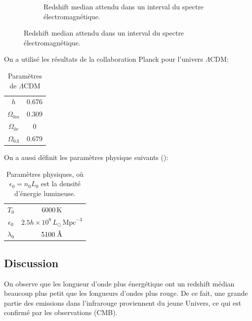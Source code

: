 \documentclass{article}
\newcommand{\angstrom}{\textup{\AA}}
\numberwithin{equation}{section}
\newcommand{\s}{\hspace{0.1cm}}
\begin{document}
\begin{figure}[H]
\begin{subfigure}[t]{0.45\textwidth}
                \caption{Redshift median attendu dans un interval du spectre 
                électromagnétique.}
                \label{fig:z_median}
        \end{subfigure}
\end{figure}

On a utilisé les résultats de la collaboration Planck pour l'univers $\Lambda$CDM:
\begin{table}[H]
        \centering
        \begin{tabular}{cc}
                \toprule
                $h$ & 0.676 \\
                $\Omega_{0m}$ & 0.309\\
                $\Omega_{0r}$ & 0 \\
                $\Omega_{0\Lambda}$ & 0.679\\
                \bottomrule
                
        \end{tabular}
        \caption{Paramètres de $\Lambda$CDM}
        \label{tab:LCDMparam}
\end{table}
On a aussi définit les paramètres physique suivants (\cite{Wesson1991}):
\begin{table}[H]
        \centering
        \begin{tabular}{cc}
                \toprule 
                $T_0$ & $6000\, \text{K}$ \\
                $\epsilon_0 $ & $2.5 h\times 10^{8}\, L_{\odot}\, \text{Mpc}^{-3}$ \\
                $\lambda_0$ & $5100\s \angstrom$ \\
                \bottomrule 
        \end{tabular}
        \caption{Paramètres physiques, où $\epsilon_0 = n_0L_0$ est la densité 
        d'énergie lumineuse.}
        \label{tab:PhysParam}
\end{table}

\subsection{Discussion}
On observe que les longueur d'onde plus énergétique ont un redshift médian beaucoup plus petit que les 
longueurs d'ondes plus rouge. De ce fait, une grande partie des emissions dans l'infrarouge 
proviennent du jeune Univers, ce qui est confirmé par les observations (CMB).
\end{document}
